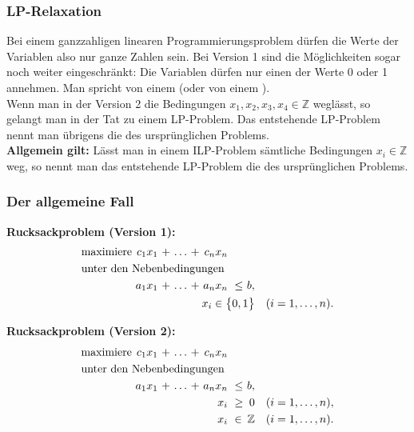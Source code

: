 \documentclass[smaller]{beamer}
\begin{document}
\begin{frame}
 \frametitle{LP-Relaxation}
 Bei einem ganzzahligen linearen Programmierungsproblem dürfen die Werte der Variablen also nur ganze Zahlen sein. Bei Version 1 sind die Möglichkeiten sogar noch weiter eingeschränkt: Die Variablen dürfen nur einen der Werte 0 oder 1 annehmen. Man spricht von einem  (oder von einem ). \\ \vspace*{0.2cm}
 Wenn man in der Version 2 die Bedingungen $x_1,x_2,x_3,x_4 \in \mathbb{Z}$ weglässt, so gelangt man in der Tat zu einem LP-Problem. Das entstehende LP-Problem nennt man übrigens die  des ursprünglichen Problems. \\ \vspace*{0.2cm}
 \textbf{Allgemein gilt:} Lässt man in einem ILP-Problem sämtliche Bedingungen $x_i \in \mathbb{Z}$ weg, so nennt man das entstehende LP-Problem die  des ursprünglichen Problems.
\end{frame}

\begin{frame}
 \frametitle{Der allgemeine Fall}
 \textbf{Rucksackproblem (Version 1):}
\begin{align*}
\begin{alignedat}{6}
& \text{maximiere } & c_1x_1 &\ + &\ \ldots &\ + &\ c_nx_n & & & \\
& \rlap{unter den Nebenbedingungen} & & & & & & & & \\
&& a_1x_1 &\ + &\ \ldots &\ + &\ a_nx_n &\ \leq &\ b, & \\
&& & & & & & & \llap{$x_i \in \big\{ 0,1 \big\}$} & \quad (i=1,\ldots,n).
\end{alignedat}
\end{align*}

\textbf{Rucksackproblem (Version 2):}
\begin{align*}
\begin{alignedat}{6}
& \text{maximiere } & c_1x_1 &\ + &\ \ldots &\ + &\ c_nx_n & & & \\
& \rlap{unter den Nebenbedingungen} & & & & & & & & \\
&& a_1x_1 &\ + &\ \ldots &\ + &\ a_nx_n &\ \leq &\ b, & \\
&& & & & & \llap{$x_i$} &\ \geq &\  0 & \quad (i=1,\ldots,n), \\
&& & & & & \llap{$x_i$} &\ \in &\ \mathbb{Z} & \quad (i=1,\ldots,n).
\end{alignedat}
\end{align*}
\end{frame}
\end{document}
